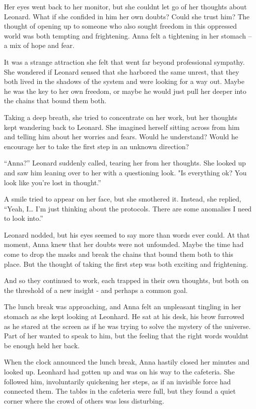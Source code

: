 \documentclass[
]{article}
\begin{document}
Her eyes went back to her monitor, but she couldn\textquotesingle t let
go of her thoughts about Leonard. What if she confided in him her own
doubts? Could she trust him? The thought of opening up to someone who
also sought freedom in this oppressed world was both tempting and
frightening. Anna felt a tightening in her stomach -- a mix of hope and
fear.

It was a strange attraction she felt that went far beyond professional
sympathy. She wondered if Leonard sensed that she harbored the same
unrest, that they both lived in the shadows of the system and were
looking for a way out. Maybe he was the key to her own freedom, or maybe
he would just pull her deeper into the chains that bound them both.

Taking a deep breath, she tried to concentrate on her work, but her
thoughts kept wandering back to Leonard. She imagined herself sitting
across from him and telling him about her worries and fears. Would he
understand? Would he encourage her to take the first step in an unknown
direction?

``Anna?'' Leonard suddenly called, tearing her from her thoughts. She
looked up and saw him leaning over to her with a questioning look. "Is
everything ok? You look like you're lost in thought.''

A smile tried to appear on her face, but she smothered it. Instead, she
replied, ``Yeah, I\ldots{} I'm just thinking about the protocols. There
are some anomalies I need to look into.''

Leonard nodded, but his eyes seemed to say more than words ever could.
At that moment, Anna knew that her doubts were not unfounded. Maybe the
time had come to drop the masks and break the chains that bound them
both to this place. But the thought of taking the first step was both
exciting and frightening.

And so they continued to work, each trapped in their own thoughts, but
both on the threshold of a new insight - and perhaps a common goal.

The lunch break was approaching, and Anna felt an unpleasant tingling in
her stomach as she kept looking at Leonhard. He sat at his desk, his
brow furrowed as he stared at the screen as if he was trying to solve
the mystery of the universe. Part of her wanted to speak to him, but the
feeling that the right words wouldn\textquotesingle t be enough held her
back.

When the clock announced the lunch break, Anna hastily closed her
minutes and looked up. Leonhard had gotten up and was on his way to the
cafeteria. She followed him, involuntarily quickening her steps, as if
an invisible force had connected them. The tables in the cafeteria were
full, but they found a quiet corner where the crowd of others was less
disturbing.
\end{document}
